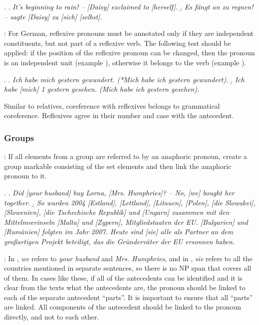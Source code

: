 \documentclass[a4paper]{article}
\begin{document}
{{%
\ex.
\a. {\sl It's beginning to rain! -- [Daisy] exclaimed to [herself].}
\b.  {\sl Es fängt an zu regnen! -- sagte [Daisy] zu [sich] [selbst].}

\cite[p. 3]{GrishinaStedeGuide}: For German, reflexive pronouns must be annotated only if they are independent constituents, but not part of a reflexive verb. 
The following test should be applied: if the position of the reflexive pronoun can be changed, then the pronoun is an independent unit (example \Next[b]), otherwise it belongs to the verb (example \Next[a]).

\ex.
\a.  {\sl Ich habe mich gestern gewundert. (*Mich habe ich gestern gewundert).}
\b. {\sl Ich habe [mich] 1 gestern gesehen. (Mich habe ich gestern gesehen).}

Similar to relatives, coreference with reflexives belongs to grammatical coreference. Reflexives agree in their number and case with the antecedent.


\subsubsection{Groups}

\cite[p. 4]{GrishinaStedeGuide}: If all elements from a group are referred to by an anaphoric pronoun, create a group markable consisting of the set elements and then link the anaphoric pronoun to it.

\ex. 
\a. {\sl Did [your husband] buy Lorna, [Mrs. Humphries]? -- No, [we] bought her together.}
\b. {\sl So wurden 2004 [Estland], [Lettland], [Litauen], [Polen], [die Slowakei], [Slowenien], [die Tschechische Republik] und [Ungarn] zusammen mit den Mittelmeerinseln [Malta] und [Zypern], Mitgliedstaaten der EU. [Bulgarien] und [Rumänien] folgten im Jahr 2007. Heute sind [sie] alle als Partner an dem großartigen Projekt beteiligt, das die Gründerväter der EU ersonnen haben.}


\cite[p. 6]{GuillouEtAlGuide}: In \Last[a], {\sl we} refers to 
{\sl your husband} and {\sl Mrs. Humphries}, and in \Last[b], {\sl sie} refers to all the countries mentioned in separate sentences, so there is no NP span that covers all of them. In cases like these, if all of the antecedents can be identified and it is clear from the texts what the antecedents are, the pronoun should be linked to each of the separate antecedent
``parts''. It is important to ensure that all ``parts'' are linked. All components of the antecedent should be linked to the pronoun directly, and not to each other.

}}
\end{document}

